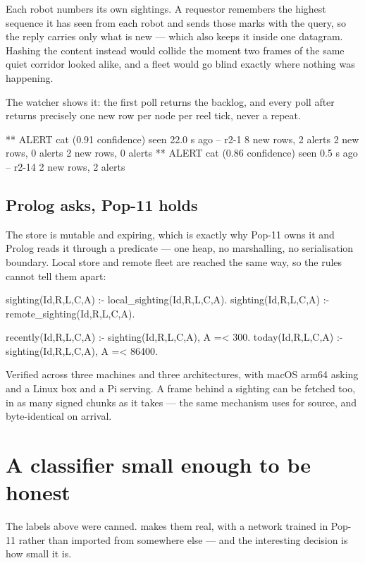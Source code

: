Each robot numbers its own sightings. A requestor remembers the highest
sequence it has seen from each robot and sends those marks with the query, so
the reply carries only what is new --- which also keeps it inside one
datagram. Hashing the content instead would collide the moment two frames of
the same quiet corridor looked alike, and a fleet would go blind exactly
where nothing was happening.

The watcher shows it: the first poll returns the backlog, and every poll
after returns precisely one new row per node per reel tick, never a repeat.

\begin{repl}
** ALERT cat (0.91 confidence) seen 22.0 s ago -- r2-1
8 new rows, 2 alerts
2 new rows, 0 alerts
2 new rows, 0 alerts
** ALERT cat (0.86 confidence) seen 0.5 s ago -- r2-14
2 new rows, 2 alerts
\end{repl}

\subsection{Prolog asks, Pop-11 holds}

The store is mutable and expiring, which is exactly why Pop-11 owns it and
Prolog reads it through a  predicate --- one heap, no
marshalling, no serialisation boundary. Local store and remote fleet are
reached the same way, so the rules cannot tell them apart:

\begin{pop}
sighting(Id,R,L,C,A) :- local_sighting(Id,R,L,C,A).
sighting(Id,R,L,C,A) :- remote_sighting(Id,R,L,C,A).

recently(Id,R,L,C,A) :- sighting(Id,R,L,C,A), A =< 300.
today(Id,R,L,C,A)    :- sighting(Id,R,L,C,A), A =< 86400.
\end{pop}

Verified across three machines and three architectures, with macOS arm64
asking and a Linux box and a Pi serving. A frame behind a sighting can be
fetched too, in as many signed chunks as it takes --- the same mechanism
 uses for source, and byte-identical on arrival.

\section{A classifier small enough to be honest}

The labels above were canned.  makes them real, with a
network trained in Pop-11 rather than imported from somewhere else --- and
the interesting decision is how small it is.

